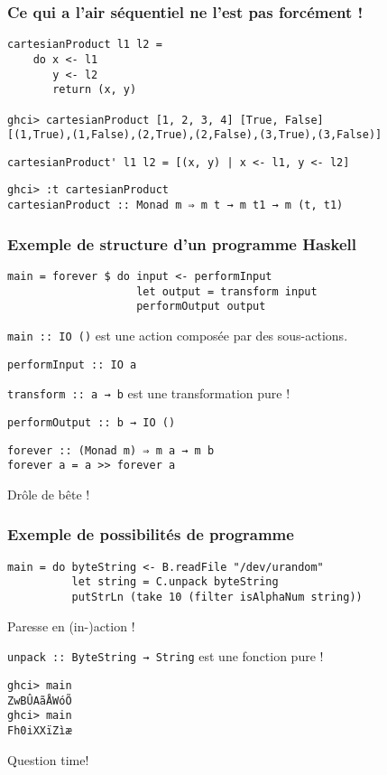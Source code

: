 \documentclass[10pt]{beamer}
\begin{document}
\begin{frame}[fragile]
\frametitle{Ce qui a l'air séquentiel ne l'est pas forcément !}
\begin{verbatim}
cartesianProduct l1 l2 =
    do x <- l1
       y <- l2
       return (x, y)

ghci> cartesianProduct [1, 2, 3, 4] [True, False]
[(1,True),(1,False),(2,True),(2,False),(3,True),(3,False)]
\end{verbatim}

\pause

\begin{verbatim}
cartesianProduct' l1 l2 = [(x, y) | x <- l1, y <- l2]
\end{verbatim}

\pause

\begin{verbatim}
ghci> :t cartesianProduct
cartesianProduct :: Monad m ⇒ m t → m t1 → m (t, t1)
\end{verbatim}

\end{frame}



\begin{frame}[fragile]
\frametitle{Exemple de structure d'un programme Haskell}
\begin{verbatim}
main = forever $ do input <- performInput
                    let output = transform input
                    performOutput output
\end{verbatim}

\verb|main :: IO ()| est une action composée par des sous-actions.

\verb|performInput :: IO a|

\verb|transform :: a → b| est une transformation pure !

\verb|performOutput :: b → IO ()|

\pause

\begin{verbatim}
forever :: (Monad m) ⇒ m a → m b
forever a = a >> forever a
\end{verbatim}

Drôle de bête !

\end{frame}



\begin{frame}[fragile]
\frametitle{Exemple de possibilités de programme}
\begin{verbatim}
main = do byteString <- B.readFile "/dev/urandom"
          let string = C.unpack byteString
          putStrLn (take 10 (filter isAlphaNum string))
\end{verbatim}

Paresse en (in-)action !

\verb|unpack :: ByteString → String| est une fonction pure !

\begin{verbatim}
ghci> main
ZwBÛAãÅWóÕ
ghci> main
Fh0iXXïZìæ
\end{verbatim}
\end{frame}



\begin{frame}
\centerline{Question time!}
\end{frame}
\end{document}
